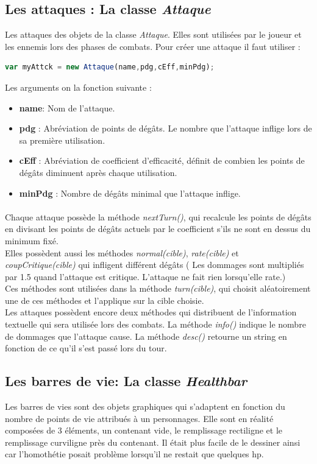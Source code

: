 \documentclass[11pt]{article}
\begin{document}
\subsection{Les attaques : La classe \textit{Attaque}}
Les attaques des objets de la classe \textit{Attaque}. Elles sont utilisées par le joueur et les ennemis lors des phases de combats. Pour créer une attaque il faut utiliser : 
\begin{lstlisting}[language=JavaScript]
var myAttck = new Attaque(name,pdg,cEff,minPdg);
\end{lstlisting} 
Les arguments on la fonction suivante : 
\begin{itemize}
\item \textbf{name}: Nom de l'attaque.
\item \textbf{pdg} : Abréviation de points de dégâts. Le nombre que l'attaque inflige lors de sa première utilisation.
\item \textbf{cEff} : Abréviation de coefficient d'efficacité, définit de combien les points de dégâts diminuent après chaque utilisation.
\item \textbf{minPdg} : Nombre de dégâts minimal que l'attaque inflige.
\end{itemize}
\paragraph{}

Chaque attaque possède la méthode \textit{nextTurn()}, qui recalcule les points de dégâts en divisant les points de dégâts actuels par le coefficient s'ils ne sont en dessus du minimum fixé.\\

Elles possèdent aussi les méthodes \textit{normal(cible)}, \textit{rate(cible)} et \textit{coupCritique(cible)} qui infligent différent dégâts ( Les dommages sont multipliés par 1.5 quand l'attaque est critique. L'attaque ne fait rien lorsqu'elle rate.)\\
Ces méthodes sont utilisées dans la méthode \textit{turn(cible)}, qui choisit aléatoirement une de ces méthodes et l'applique sur la cible choisie. \\

Les attaques possèdent encore deux méthodes qui distribuent de l'information textuelle qui sera utilisée lors des combats. La méthode \textit{info()} indique le nombre de dommages que l'attaque cause. La méthode \textit{desc()} retourne un string en fonction de ce qu'il s'est passé lors du tour.
\subsection{Les barres de vie: La classe \textit{Healthbar}}
Les barres de vies sont des objets graphiques qui s'adaptent en fonction du nombre de points de vie attribués à un personnages. Elle sont en réalité composées de 3 éléments, un contenant vide, le remplissage rectiligne et le remplissage curviligne près du contenant. Il était plus facile de le dessiner ainsi car l'homothétie posait problème lorsqu'il ne restait que quelques hp. \\
\end{document}
